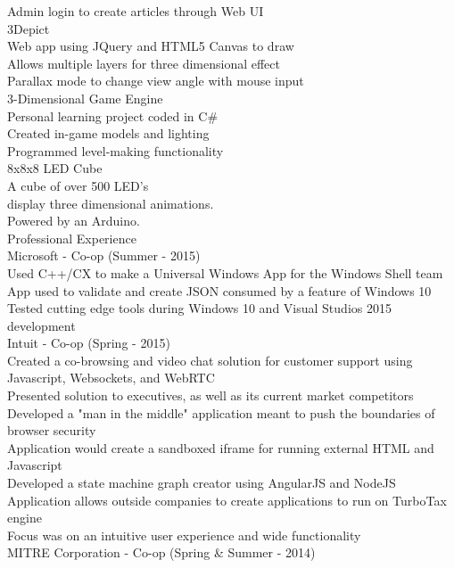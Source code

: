 \documentclass{article}
\begin{document}
Admin login to create articles through Web UI \\
{\large 3Depict } \\
Web app using JQuery and HTML5 Canvas to draw \\
Allows multiple layers for three dimensional effect \\
Parallax mode to change view angle with mouse input \\
{\large 3-Dimensional Game Engine } \\
Personal learning project coded in C\# \\
Created in-game models and lighting  \\
Programmed level-making functionality \\
{\large 8x8x8 LED Cube } \\
A cube of over 500 LED's \\
display three dimensional animations. \\
Powered by an Arduino. \\
{\Large Professional Experience } \\
{\large Microsoft - Co-op (Summer - 2015) } \\
Used C++/CX to make a Universal Windows App for the Windows Shell team \\
App used to validate and create JSON consumed by a feature of Windows 10 \\
Tested cutting edge tools during Windows 10 and Visual Studios 2015 development \\
{\large Intuit - Co-op (Spring - 2015) } \\
Created a co-browsing and video chat solution for customer support using Javascript, Websockets, and WebRTC \\
Presented solution to executives, as well as its current market competitors \\
Developed a "man in the middle" application meant to push the boundaries of browser security \\
Application would create a sandboxed iframe for running external HTML and Javascript \\
Developed a state machine graph creator using AngularJS and NodeJS \\
Application allows outside companies to create applications to run on TurboTax engine \\
Focus was on an intuitive user experience and wide functionality \\
{\large MITRE Corporation - Co-op (Spring \& Summer - 2014) } \\
\end{document}
